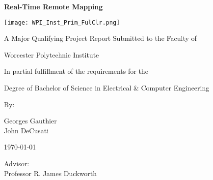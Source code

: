 \begin{titlepage}
	\centering
	{\huge\bfseries Real-Time Remote Mapping\par}
	\vfill
	\texttt{[image: WPI\_Inst\_Prim\_FulClr.png]} %
	\vfill
	{\par\large A Major Qualifying Project Report Submitted to the Faculty of \par}
	\vspace{0.25cm}
	{\large Worcester Polytechnic Institute\par}
	\vfill
	{\large In partial fulfillment of the requirements for the \par}
	\vspace{0.25cm}
	{\large Degree of Bachelor of Science in Electrical \& Computer Engineering\par}
	\vfill
	{\large By: \par}
	\vspace{0.25cm}
	{\Large Georges Gauthier \\ John DeCusati \par} 
	\vfill
	{\large \today \par}
	\vfill
	{\begin{flushright} 
	\large Advisor: \\ \Large Professor R. James Duckworth
	\end{flushright}}
\end{titlepage}